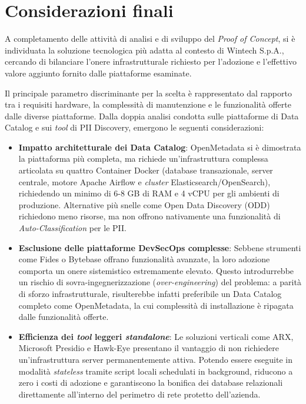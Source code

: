 \section{Considerazioni finali}
A completamento delle attività di analisi e di sviluppo del \emph{Proof of Concept}, si è individuata la soluzione tecnologica più adatta al contesto di Wintech S.p.A., 
cercando di bilanciare l'onere infrastrutturale richiesto per l'adozione e l'effettivo valore aggiunto fornito dalle piattaforme esaminate.

Il principale parametro discriminante per la scelta è rappresentato dal rapporto tra i requisiti hardware, la complessità di manutenzione e le funzionalità offerte dalle 
diverse piattaforme. Dalla doppia analisi condotta sulle piattaforme di Data Catalog e sui \emph{tool} di PII Discovery, emergono le seguenti considerazioni:
\begin{itemize}
    \item \textbf{Impatto architetturale dei Data Catalog}: OpenMetadata si è dimostrata la piattaforma più completa, ma richiede un'infrastruttura complessa articolata su quattro Container Docker (database transazionale, server centrale, motore Apache Airflow e \emph{cluster} Elasticsearch/OpenSearch), richiedendo un minimo di 6-8 GB di RAM e 4 vCPU per gli ambienti di produzione. Alternative più snelle come Open Data Discovery (ODD) richiedono meno risorse, ma non offrono nativamente una funzionalità di \emph{Auto-Classification} per le PII.
    \item \textbf{Esclusione delle piattaforme DevSecOps complesse}: Sebbene strumenti come Fides o Bytebase offrano funzionalità avanzate, la loro adozione comporta un onere sistemistico estremamente elevato. Questo introdurrebbe un rischio di sovra-ingegnerizzazione (\emph{over-engineering}) del problema: a parità di sforzo infrastrutturale, risulterebbe infatti preferibile un Data Catalog completo come OpenMetadata, la cui complessità di installazione è ripagata dalle funzionalità offerte.
    \item \textbf{Efficienza dei \emph{tool} leggeri \emph{standalone}}: Le soluzioni verticali come ARX, Microsoft Presidio e Hawk-Eye presentano il vantaggio di non richiedere un'infrastruttura server permanentemente attiva. Potendo essere eseguite in modalità \emph{stateless} tramite script locali schedulati in background, riducono a zero i costi di adozione e garantiscono la bonifica dei database relazionali direttamente all'interno del perimetro di rete protetto dell'azienda.
\end{itemize}

